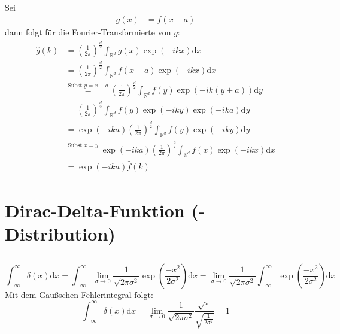 \documentclass[a4paper,11pt]{article}
\begin{document}
Sei
\begin{align}
    g(x) &= f(x-a)
\end{align}
dann folgt für die Fourier-Transformierte von $g$:
\begin{align}
\begin{split}
    \hat{g}(k) &= \left(\frac{1}{2\pi} \right)^{\frac{d}{2}} \int_{\mathbb{R}^d} g(x) \exp(-ikx) \text{d}x \\
               &= \left(\frac{1}{2\pi} \right)^{\frac{d}{2}} \int_{\mathbb{R}^d} f(x-a) \exp(-ikx) \text{d}x \\
               &\overset{\text{Subst.} y=x-a}{=} \left(\frac{1}{2\pi} \right)^{\frac{d}{2}} \int_{\mathbb{R}^d} f(y) \exp(-ik(y+a)) \text{d}y \\
               &= \left(\frac{1}{2\pi} \right)^{\frac{d}{2}} \int_{\mathbb{R}^d} f(y) \exp(-iky) \exp(-ika) \text{d}y \\
               &= \exp(-ika) \left(\frac{1}{2\pi} \right)^{\frac{d}{2}} \int_{\mathbb{R}^d} f(y) \exp(-iky) \text{d}y \\
               &\overset{\text{Subst.} x=y}{=} \exp(-ika) \left(\frac{1}{2\pi} \right)^{\frac{d}{2}} \int_{\mathbb{R}^d} f(x) \exp(-ikx) \text{d}x \\
               &= \exp(-ika) \hat{f}(k)
\end{split}
\end{align}


\section{Dirac-Delta-Funktion (-Distribution)}

\subsection{}
\begin{equation}
        \int_{-\infty}^\infty \delta(x) \text{d}x = \int_{-\infty}^\infty \lim_{\sigma \to 0}\frac{1}{\sqrt{2\pi\sigma^2}}\exp(\frac{-x^2}{2\sigma^2})\text{d}x = \lim_{\sigma \to 0}\frac{1}{\sqrt{2\pi\sigma^2}} \int_{-\infty}^\infty \exp(\frac{-x^2}{2\sigma^2})\text{d}x
\end{equation}
Mit dem Gaußschen Fehlerintegral folgt:
\begin{equation}
        \int_{-\infty}^\infty \delta(x) \text{d}x = \lim_{\sigma \to 0}\frac{1}{\sqrt{2\pi\sigma^2}} \frac{\sqrt{\pi}}{\sqrt{\frac{1}{2\sigma^2}}} = 1
\end{equation}
\end{document}
